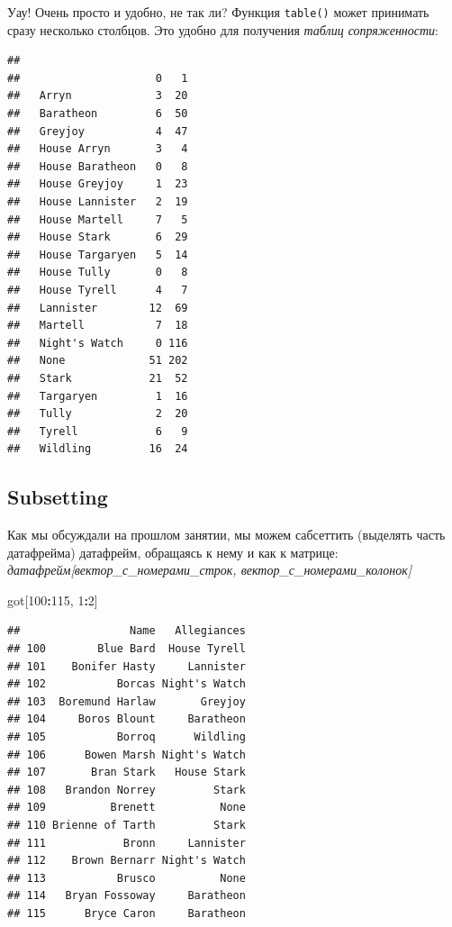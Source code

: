 \documentclass[]{book}
\newenvironment{Shaded}{\begin{snugshade}}{\end{snugshade}}
\newcommand{\DecValTok}[1]{\textcolor[rgb]{0.00,0.00,0.81}{#1}}
\newcommand{\KeywordTok}[1]{\textcolor[rgb]{0.13,0.29,0.53}{\textbf{#1}}}
\newcommand{\NormalTok}[1]{#1}
\newcommand{\OperatorTok}[1]{\textcolor[rgb]{0.81,0.36,0.00}{\textbf{#1}}}
\begin{document}
Уау! Очень просто и удобно, не так ли? Функция \texttt{table()} может принимать сразу несколько столбцов. Это удобно для получения \emph{таблиц сопряженности}:

\begin{Shaded}
\end{Shaded}

\begin{verbatim}
##                  
##                     0   1
##   Arryn             3  20
##   Baratheon         6  50
##   Greyjoy           4  47
##   House Arryn       3   4
##   House Baratheon   0   8
##   House Greyjoy     1  23
##   House Lannister   2  19
##   House Martell     7   5
##   House Stark       6  29
##   House Targaryen   5  14
##   House Tully       0   8
##   House Tyrell      4   7
##   Lannister        12  69
##   Martell           7  18
##   Night's Watch     0 116
##   None             51 202
##   Stark            21  52
##   Targaryen         1  16
##   Tully             2  20
##   Tyrell            6   9
##   Wildling         16  24
\end{verbatim}

\hypertarget{subset}{%
\subsection{Subsetting}\label{subset}}

Как мы обсуждали на прошлом занятии, мы можем сабсеттить (выделять часть датафрейма) датафрейм, обращаясь к нему и как к матрице: \emph{датафрейм{[}вектор\_с\_номерами\_строк, вектор\_с\_номерами\_колонок{]}}

\begin{Shaded}
\begin{Highlighting}[]
\NormalTok{got[}\DecValTok{100}\OperatorTok{:}\DecValTok{115}\NormalTok{, }\DecValTok{1}\OperatorTok{:}\DecValTok{2}\NormalTok{]}
\end{Highlighting}
\end{Shaded}

\begin{verbatim}
##                 Name   Allegiances
## 100        Blue Bard  House Tyrell
## 101    Bonifer Hasty     Lannister
## 102           Borcas Night's Watch
## 103  Boremund Harlaw       Greyjoy
## 104     Boros Blount     Baratheon
## 105           Borroq      Wildling
## 106      Bowen Marsh Night's Watch
## 107       Bran Stark   House Stark
## 108   Brandon Norrey         Stark
## 109          Brenett          None
## 110 Brienne of Tarth         Stark
## 111            Bronn     Lannister
## 112    Brown Bernarr Night's Watch
## 113           Brusco          None
## 114   Bryan Fossoway     Baratheon
## 115      Bryce Caron     Baratheon
\end{verbatim}
\end{document}
